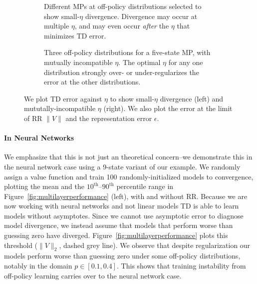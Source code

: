 \documentclass[11pt]{article}
\begin{document}
\begin{figure}[p]
  \begin{subfigure}[t]{0.48\textwidth}
    \centering
    
    \vspace{-1.25em}
    \caption{Different MPs at off-policy distributions selected to show small-$\eta$ divergence. Divergence may occur at multiple $\eta$, and may even occur \emph{after} the $\eta$ that minimizes TD error. }
    \label{fig:etagraph}
  \end{subfigure}
  \hfill
  \begin{subfigure}[t]{0.48\textwidth}
    \centering
    
    \vspace{-1.25em}
    \caption{Three off-policy distributions for a five-state MP, with mutually incompatible $\eta$. The optimal $\eta$ for any one distribution strongly over- or under-regularizes the error at the other distributions. }
    \label{fig:mismatchedeta}
  \end{subfigure}
    \caption{We plot TD error against $\eta$ to show small-$\eta$ divergence (left) and mututally-incompatible $\eta$ (right). We also plot the error at the limit of RR $\|V\|$ and the representation error $\epsilon$. }
\end{figure}

\paragraph{In Neural Networks} We emphasize that this is not just an theoretical concern--we demonstrate this in the neural network case using a 9-state variant of our example. We randomly assign a value function and train 100 randomly-initialized models to convergence, plotting the mean and the $10^\text{th}$--$90^\text{th}$ percentile range in Figure~\ref{fig:multilayerperformance} (left), with and without RR. 
Because we are now working with neural networks and not linear models TD is able to learn models without asymptotes. Since we cannot use asymptotic error to diagnose model divergence, we instead assume that models that perform worse than guessing zero have diverged. Figure~\ref{fig:multilayerperformance} plots this threshold ($\|V\|_2$, dashed grey line). We observe that despite regularization our models perform worse than guessing zero under some off-policy distributions, notably in the domain $p\in[0.1, 0.4]$. This shows that training instability from off-policy learning carries over to the neural network case.
\end{document}
